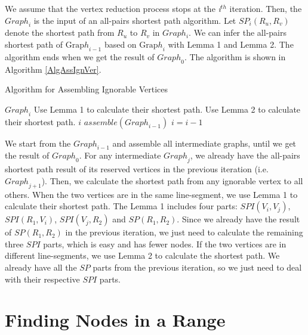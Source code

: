 \noindent We assume that the vertex reduction process stops at the \textit{i}${}^{th}$ iteration. Then, the ${Graph}_i$ is the input of an all-pairs shortest path algorithm. Let $SP_i\left(R_u,R_v\right)$ denote the shortest path from $R_u$ to $R_v$ in $Graph_i$. We can infer the all-pairs shortest path of ${\mathrm{Grap}h}_{i-1}$ based on ${\mathrm{Grap}h}_i$ with Lemma 1 and Lemma 2. The algorithm ends when we get the result of ${Graph}_0$. The algorithm is shown in Algorithm \ref{AlgAssIgnVer}.

\begin{algorithm} [hbtp]
\caption{Algorithm for Assembling Ignorable Vertices}\label{AlgAssIgnVer}
\begin{algorithmic}[1]
 {${Graph}_i$}
			\State Use Lemma 1 to calculate their shortest path.
		\Else
			\State Use Lemma 2 to calculate their shortest path.
		\EndIf
	\EndFor
\EndFor
\EndProcedure
{} {$i$}
	\State $assemble\left({Graph}_{i-1}\right)$
	\State $i=i-1$
\EndWhile
\EndProcedure
\end{algorithmic}
\end{algorithm}

\noindent We start from the ${Graph}_{i-1}$ and assemble all intermediate graphs, until we get the result of ${Graph}_0$. For any intermediate ${Graph}_j$, we already have the all-pairs shortest path result of its reserved vertices in the previous iteration (i.e. ${Graph}_{j+1}$). Then, we calculate the shortest path from any ignorable vertex to all others. When the two vertices are in the same line-segment, we use Lemma 1 to calculate their shortest path. The Lemma 1 includes four parts: $SPI\left(V_i,V_j\right)$, $SPI\left(R_1,V_i\right)$, $SPI\left(V_j,R_2\right)$ and $SP\left(R_1,R_2\right)$. Since we already have the result of $SP\left(R_1,R_2\right)$ in the previous iteration, we just need to calculate the remaining three $SPI$ parts, which is easy and has fewer nodes. If the two vertices are in different line-segments, we use Lemma 2 to calculate the shortest path. We already have all the $SP$ parts from the previous iteration, so we just need to deal with their respective $SPI$ parts.


\section{ Finding Nodes in a Range}

